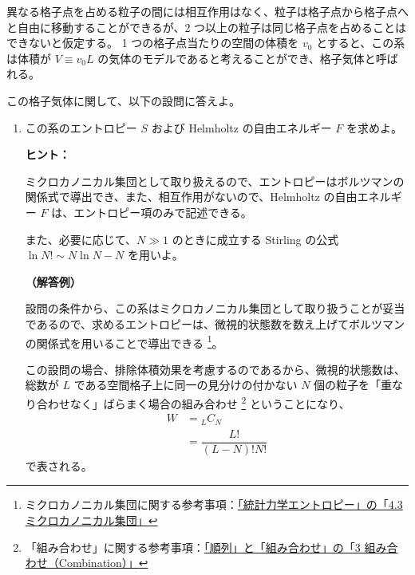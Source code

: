\documentclass[uplatex,dvipdfmx,a4paper,11pt]{jsarticle}
\begin{document}
異なる格子点を占める粒子の間には相互作用はなく、粒子は格子点から格子点へと自由に移動することができるが、2 つ以上の粒子は同じ格子点を占めることはできないと仮定する。
1 つの格子点当たりの空間の体積を $v_0$ とすると、この系は体積が $V \equiv v_0 L$ の気体のモデルであると考えることができ、格子気体と呼ばれる。

この格子気体に関して、以下の設問に答えよ。


\begin{enumerate}
\setlength{\parskip}{0cm} %
\setlength{\itemsep}{0.3cm} %

\item
この系のエントロピー $S$ および Helmholtz の自由エネルギー $F$ を求めよ。
\vspace{8pt}

\begin{itembox}[l]{{\bf ヒント：}}

ミクロカノニカル集団として取り扱えるので、エントロピーはボルツマンの関係式で導出でき、また、相互作用がないので、Helmholtz の自由エネルギー $F$ は、エントロピー項のみで記述できる。

また、必要に応じて、$N \gg 1$ のときに成立する Stirling の公式 $\ln N! \sim N \ln N - N$ を用いよ。
\end{itembox}

\vspace{8pt}

{\bf （解答例）}

設問の条件から、この系はミクロカノニカル集団として取り扱うことが妥当であるので、求めるエントロピーは、微視的状態数を数え上げてボルツマンの関係式を用いることで導出できる
\footnote{
ミクロカノニカル集団に関する参考事項：\href{http://kisokouza.island.ac/documents/Stat_Phys_Entropy.pdf}{「統計力学エントロピー」の「4.3 ミクロカノニカル集団」}
}。

この設問の場合、排除体積効果を考慮するのであるから、微視的状態数は、総数が $L$ である空間格子上に同一の見分けの付かない $N$ 個の粒子を「重なり合わせなく」ばらまく場合の組み合わせ
\footnote{
「組み合わせ」に関する参考事項：\href{http://kisokouza.island.ac/documents/Permutation_Combination.pdf}{「順列」と「組み合わせ」の「3 組み合わせ（Combination）」}
}
ということになり、
\begin{align*}
W 
	&= {}_L C_N \\
	&= \dfrac{L!}{(L-N)! N!} 
\end{align*}
で表される。


\end{enumerate}
\end{document}
